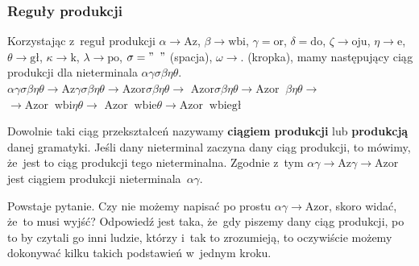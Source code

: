 \documentclass[10pt,t]{beamer}
\begin{document}
\begin{frame}
  \frametitle{Reguły produkcji}


  Korzystając z~reguł produkcji $\alpha \to \text{Az}$,
  $\beta \to \text{wbi}$, $\gamma = \text{or}$, $\delta = \text{do}$,
  $\zeta \to \text{oju}$, $\eta \to \text{e}$, $\theta \to \text{gł}$,
  $\kappa \to \text{k}$, $\lambda \to \text{po}$, $\sigma = "\;\;"$ (spacja),
  $\omega \to .$ (kropka), mamy następujący ciąg produkcji dla
  nieterminala $\alpha\gamma\sigma\beta\eta\theta$. \\
  $\alpha\gamma\sigma\beta\eta\theta \to \text{Az}\gamma\sigma\beta\eta\theta \to \text{Azor}\sigma\beta\eta\theta \to $
  $\text{Azor}\sigma\beta\eta\theta \to \text{Azor} \; \; \beta\eta\theta \to $ \\
  $\to \text{Azor} \; \; \text{wbi}\eta\theta \to $
  $\text{Azor} \; \; \text{wbie}\theta \to \text{Azor} \; \; \text{wbiegł}$

  Dowolnie taki ciąg przekształceń nazywamy \textbf{ciągiem produkcji}
  lub \textbf{produkcją} danej gramatyki. Jeśli dany nieterminal zaczyna
  dany ciąg produkcji, to mówimy, że~jest to ciąg produkcji tego
  nieterminalna. Zgodnie z~tym
  $\alpha\gamma \to \text{Az}\gamma \to \text{Azor}$ jest ciągiem produkcji
  nieterminala~$\alpha\gamma$.

  Powstaje pytanie. Czy nie możemy napisać po prostu
  $\alpha\gamma \to \text{Azor}$, skoro widać, że~to musi wyjść? Odpowiedź jest taka,
  że~gdy piszemy dany ciąg produkcji, po to by czytali go inni ludzie,
  którzy i~tak to zrozumieją, to oczywiście możemy dokonywać kilku takich
  podstawień w~jednym kroku.

\end{frame}
\end{document}
